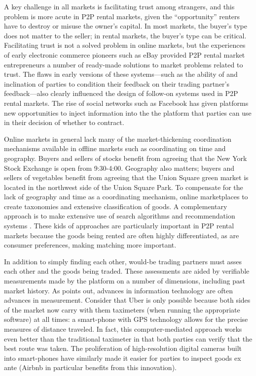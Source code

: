 \documentclass[11pt]{article}
\begin{document}
A key challenge in all markets is facilitating trust among strangers, and this problem is more acute in P2P rental markets, given the ``opportunity'' renters have to destroy or misuse the owner's capital.
In most markets, the buyer's type does not matter to the seller; in rental markets, the buyer's type can be critical. 
Facilitating trust is not a solved problem in online markets, but the experiences of early electronic commerce pioneers such as eBay provided P2P rental market entrepreneurs a number of ready-made solutions to market problems related to trust. 
The flaws in early versions of these systems---such as the ability of and inclination of parties to condition their feedback on their trading partner's feedback---also clearly influenced the design of follow-on systems used in P2P rental markets. 
The rise of social networks such as Facebook has given platforms new opportunities to inject information into the the platform that parties can use in their decision of whether to contract. 

Online markets in general lack many of the market-thickening coordination mechanisms available in offline markets such as coordinating on time and geography.
Buyers and sellers of stocks benefit from agreeing that the New York Stock Exchange is open from 9:30-4:00.
Geography also matters; buyers and sellers of vegetables benefit from agreeing that the Union Square green market is located in the northwest side of the Union Square Park. 
To compensate for the lack of geography and time as a coordinating mechanism, online marketplaces to create taxonomies and extensive classification of goods.
A complementary approach is to make extensive use of search algorithms and recommendation systems \citep{resnick1997recommender, adomavicius2005toward}.
These kids of approaches are particularly important in P2P rental markets because the goods being rented are often highly differentiated, as are consumer preferences, making matching more important. 

In addition to simply finding each other, would-be trading partners must asses each other and the goods being traded. 
These assessments are aided by verifiable measurements made by the platform on a number of dimensions, including past market history. 
As \cite{varian2010computer} points out, advances in information technology are often advances in measurement.  
Consider that Uber is only possible because both sides of the market now carry with them taximeters (when running the appropriate software) at all times: 
a smart-phone with GPS technology allows for the precise measures of distance traveled.
In fact, this computer-mediated approach works even better than the traditional taximeter in that both parties can verify that the best route was taken. 
The proliferation of high-resolution digital cameras built into smart-phones have similarly made it easier for parties to inspect goods ex ante (Airbnb in particular benefits from this innovation).  
 
\end{document}
